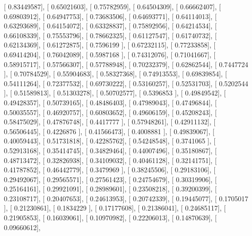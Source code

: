 \documentclass{article}
\begin{document}
       [ 0.83449587],
       [ 0.65021603],
       [ 0.75782959],
       [ 0.64504309],
       [ 0.66662407],
       [ 0.69803912],
       [ 0.64947753],
       [ 0.73683506],
       [ 0.64693771],
       [ 0.64114013],
       [ 0.63293689],
       [ 0.64154072],
       [ 0.63328837],
       [ 0.75892956],
       [ 0.64214534],
       [ 0.66108339],
       [ 0.75553796],
       [ 0.78662325],
       [ 0.61127547],
       [ 0.61740732],
       [ 0.62134369],
       [ 0.61272875],
       [ 0.7596199 ],
       [ 0.67232115],
       [ 0.77233858],
       [ 0.69414204],
       [ 0.76042089],
       [ 0.5987168 ],
       [ 0.74312076],
       [ 0.71041667],
       [ 0.58915717],
       [ 0.57566307],
       [ 0.57788948],
       [ 0.70232379],
       [ 0.62862544],
       [ 0.7447724 ],
       [ 0.70784529],
       [ 0.55904683],
       [ 0.58327368],
       [ 0.74913553],
       [ 0.69839854],
       [ 0.54111264],
       [ 0.72377532],
       [ 0.69730222],
       [ 0.53160257],
       [ 0.52531703],
       [ 0.5202544 ],
       [ 0.51589813],
       [ 0.51303278],
       [ 0.50702577],
       [ 0.5396853 ],
       [ 0.49849542],
       [ 0.49428357],
       [ 0.50739165],
       [ 0.48486403],
       [ 0.47989043],
       [ 0.47496844],
       [ 0.50035557],
       [ 0.46920757],
       [ 0.60803652],
       [ 0.49606159],
       [ 0.45208243],
       [ 0.58475029],
       [ 0.47876748],
       [ 0.4417777 ],
       [ 0.57948261],
       [ 0.42911132],
       [ 0.56506445],
       [ 0.4226876 ],
       [ 0.41566473],
       [ 0.4008881 ],
       [ 0.49839067],
       [ 0.40059443],
       [ 0.51731818],
       [ 0.42285762],
       [ 0.54248548],
       [ 0.3741065 ],
       [ 0.52913168],
       [ 0.35414745],
       [ 0.34829464],
       [ 0.44007496],
       [ 0.35180867],
       [ 0.48713472],
       [ 0.32826938],
       [ 0.34109032],
       [ 0.40461128],
       [ 0.32141751],
       [ 0.41787852],
       [ 0.46442779],
       [ 0.3479969 ],
       [ 0.38245506],
       [ 0.29183106],
       [ 0.29492067],
       [ 0.29565571],
       [ 0.27561423],
       [ 0.24754679],
       [ 0.30319906],
       [ 0.25164161],
       [ 0.29921091],
       [ 0.28989601],
       [ 0.23508218],
       [ 0.39200399],
       [ 0.23108717],
       [ 0.20407653],
       [ 0.24613953],
       [ 0.20742339],
       [ 0.19445077],
       [ 0.1705017 ],
       [ 0.21230861],
       [ 0.1834229 ],
       [ 0.17177608],
       [ 0.21386041],
       [ 0.24685117],
       [ 0.21905853],
       [ 0.16039061],
       [ 0.10970982],
       [ 0.22206013],
       [ 0.14870639],
       [ 0.09660612],
\end{document}
